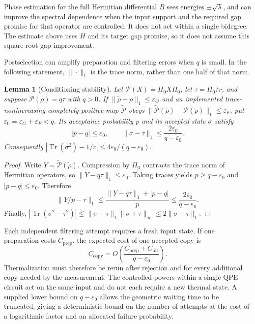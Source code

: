 \documentclass[a4paper,onecolumn,unpublished]{quantumarticle}
\theoremstyle{plain}
\newtheorem{lemma}[theorem]{Lemma}
\theoremstyle{definition}
\theoremstyle{definition}
\numberwithin{equation}{section}
\begin{document}
Phase estimation for the full Hermitian differential $B$ sees energies
$\pm\sqrt\lambda$, and can improve the spectral dependence when the
input support and the required gap promise for that operator are
controlled. It does not act within a single bidegree.
The estimate above uses $H$ and its target gap promise, so it
does not assume this square-root-gap improvement.

Postselection can amplify preparation and filtering errors when
$q$ is small. In the following statement,
$\|\cdot\|_1$ is the trace norm, rather than one half of that norm.

\begin{lemma}[Conditioning stability]\label{lem:conditioning-stability}
Let $\mathcal P(X)=\Pi_0X\Pi_0$, let
$\tau=\Pi_0/r$, and suppose $\mathcal P(\rho)=q\tau$ with $q>0$.
If $\|\widetilde\rho-\rho\|_1\le\varepsilon_G$ and an implemented
trace-nonincreasing completely positive map
$\widetilde{\mathcal P}$ obeys
$\|\widetilde{\mathcal P}(\widetilde\rho)
       -\mathcal P(\widetilde\rho)\|_1\le\varepsilon_F$,
put $\varepsilon_0=\varepsilon_G+\varepsilon_F<q$.
Its acceptance probability $p$ and its accepted state $\sigma$
satisfy
\begin{equation}\label{eq:conditioning-error}
 |p-q|\le\varepsilon_0,\qquad
 \|\sigma-\tau\|_1\le\frac{2\varepsilon_0}{q-\varepsilon_0}.
\end{equation}
Consequently
$|\operatorname{Tr}(\sigma^2)-1/r|
 \le4\varepsilon_0/(q-\varepsilon_0)$.
\end{lemma}

\begin{proof}
Write $Y=\widetilde{\mathcal P}(\widetilde\rho)$.
Compression by $\Pi_0$ contracts the trace norm of Hermitian
operators, so $\|Y-q\tau\|_1\le\varepsilon_0$.
Taking traces yields $p\ge q-\varepsilon_0$ and
$|p-q|\le\varepsilon_0$. Therefore
\[
 \|Y/p-\tau\|_1
 \le\frac{\|Y-q\tau\|_1+|p-q|}{p}
 \le\frac{2\varepsilon_0}{q-\varepsilon_0}.
\]
Finally,
$|\operatorname{Tr}(\sigma^2-\tau^2)|
 \le\|\sigma-\tau\|_1\|\sigma+\tau\|_\infty
 \le2\|\sigma-\tau\|_1$.
\end{proof}

Each independent filtering attempt requires a fresh input state.
If one preparation costs $C_{\mathrm{prep}}$, the expected cost
of one accepted copy is
\begin{equation}\label{eq:accepted-copy-cost}
 C_{\mathrm{copy}}
 =O\!\left(\frac{C_{\mathrm{prep}}+C_{\mathrm{filt}}}
                 {q-\varepsilon_0}\right).
\end{equation}
Thermalization must therefore be rerun after rejection and for every
additional copy needed by the measurement. The controlled powers
within a single QPE circuit act on the same input and do not each
require a new thermal state. A supplied lower bound on
$q-\varepsilon_0$ allows the geometric waiting time to be truncated,
giving a deterministic bound on the number of attempts at the cost
of a logarithmic factor and an allocated failure probability.
\end{document}
